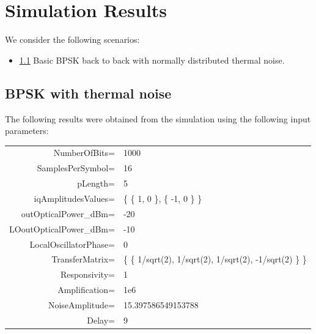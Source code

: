 \documentclass[a4paper]{article}
\begin{document}
\section{Simulation Results}

We consider the following scenarios:
\begin{itemize}
\item \ref{subsec:scenario1} Basic BPSK back to back with normally distributed thermal noise.
\end{itemize}

\subsection{BPSK with thermal noise}\label{subsec:scenario1}

The following results were obtained from the simulation using the following input parameters:
\begin{table}[H]
\centering
\begin{tabular}{rl}
NumberOfBits=           & 1000                                                     \\
SamplesPerSymbol=       & 16                                                       \\
pLength=                & 5                                                        \\
iqAmplitudesValues=     & \{ \{ 1, 0 \}, \{ -1, 0 \} \}                            \\
outOpticalPower\_dBm=   & -20                                                      \\
LOoutOpticalPower\_dBm= & -10                                                      \\
LocalOscillatorPhase=   & 0                                                        \\
TransferMatrix=         & \{ \{ 1/sqrt(2), 1/sqrt(2), 1/sqrt(2), -1/sqrt(2) \} \}  \\
Responsivity=           & 1                                                        \\
Amplification=          & 1e6                                                      \\
NoiseAmplitude=         & 15.397586549153788                                       \\
Delay=                  & 9                                                        \\
\end{tabular}
\end{table}
\end{document}
